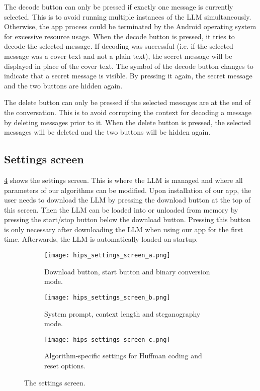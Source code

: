 The decode button can only be pressed if exactly one message is currently selected. This is to avoid running multiple instances of the \gls{LLM} simultaneously. Otherwise, the app process could be terminated by the Android operating system for excessive resource usage. When the decode button is pressed, it tries to decode the selected message. If decoding was successful (i.e. if the selected message was a cover text and not a plain text), the secret message will be displayed in place of the cover text. The symbol of the decode button changes to indicate that a secret message is visible. By pressing it again, the secret message and the two buttons are hidden again.

The delete button can only be pressed if the selected messages are at the end of the conversation. This is to avoid corrupting the context for decoding a message by deleting messages prior to it. When the delete button is pressed, the selected messages will be deleted and the two buttons will be hidden again.

\subsection{Settings screen}
\label{sec:settingsScreen}
\cref{fig:settingsScreen} shows the settings screen. This is where the \gls{LLM} is managed and where all parameters of our algorithms can be modified. Upon installation of our app, the user needs to download the \gls{LLM} by pressing the download button at the top of this screen. Then the \gls{LLM} can be loaded into or unloaded from memory by pressing the start/stop button below the download button. Pressing this button is only necessary after downloading the \gls{LLM} when using our app for the first time. Afterwards, the \gls{LLM} is automatically loaded on startup.

\begin{figure}
	\begin{wide}
		\captionsetup{width=\linewidth}
		\begin{subfigure}{0.3\linewidth}
			\centering
			\texttt{[image: hips\_settings\_screen\_a.png]}
			\caption{Download button, start button and binary conversion mode.}
			\label{fig:settingsScreenA}
		\end{subfigure}
        \hfill
        \begin{subfigure}{0.3\linewidth}
			\centering
			\texttt{[image: hips\_settings\_screen\_b.png]}
			\caption{System prompt, context length and steganography mode.}
			\label{fig:settingsScreenB}
		\end{subfigure}
        \hfill
        \begin{subfigure}{0.3\linewidth}
			\centering
			\texttt{[image: hips\_settings\_screen\_c.png]}
			\caption{Algorithm-specific settings for Huffman coding and reset options.}
			\label{fig:settingsScreenC}
		\end{subfigure}
		\caption[HiPS: Settings screen]{The settings screen.}
		\label{fig:settingsScreen}
	\end{wide}
\end{figure}


